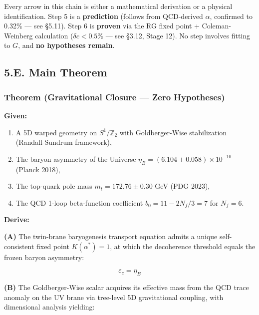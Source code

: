 \documentclass[
  11pt,
]{article}
\providecommand{\tightlist}{%
  \setlength{\itemsep}{0pt}\setlength{\parskip}{0pt}}
\begin{document}
Every arrow in this chain is either a mathematical derivation or a
physical identification. Step 5 is a \textbf{prediction} (follows from
QCD-derived \(\alpha\), confirmed to 0.32\% --- see §5.11). Step 6 is
\textbf{proven} via the RG fixed point + Coleman-Weinberg calculation
(\(\delta c < 0.5\%\) --- see §3.12, Stage 12). No step involves fitting
to \(G\), and \textbf{no hypotheses remain}.

\bigskip

\hypertarget{e.-main-theorem}{%
\subsection{5.E. Main Theorem}\label{e.-main-theorem}}

\bigskip

\hypertarget{theorem-gravitational-closure-zero-hypotheses}{%
\subsubsection{Theorem (Gravitational Closure --- Zero
Hypotheses)}\label{theorem-gravitational-closure-zero-hypotheses}}

\textbf{Given:}

\begin{enumerate}
\def\labelenumi{\arabic{enumi}.}
\tightlist
\item
  A 5D warped geometry on \(S^1/\mathbb{Z}_2\) with Goldberger-Wise
  stabilization (Randall-Sundrum framework),
\item
  The baryon asymmetry of the Universe
  \(\eta_B = (6.104 \pm 0.058) \times 10^{-10}\) (Planck 2018),
\item
  The top-quark pole mass \(m_t = 172.76 \pm 0.30\) GeV (PDG 2023),
\item
  The QCD 1-loop beta-function coefficient \(b_0 = 11 - 2N_f/3 = 7\) for
  \(N_f = 6\).
\end{enumerate}

\textbf{Derive:}

\textbf{(A)} The twin-brane baryogenesis transport equation admits a
unique self-consistent fixed point \(K(\alpha^*) = 1\), at which the
decoherence threshold equals the frozen baryon asymmetry:

\[\varepsilon_c = \eta_B\]

\textbf{(B)} The Goldberger-Wise scalar acquires its effective mass from
the QCD trace anomaly on the UV brane via tree-level 5D gravitational
coupling, with dimensional analysis yielding:
\end{document}
